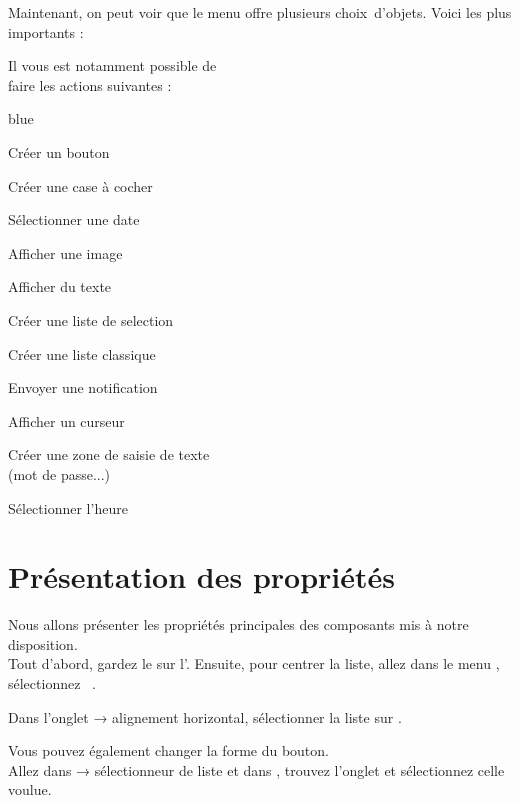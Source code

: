 Maintenant, on peut voir que le menu offre plusieurs choix d'objets. Voici les plus importants :

Il vous est notamment possible de \\faire les actions suivantes :

\begin{items}{blue}{\Triangle}
    \item Créer un bouton
    \item Créer une case à cocher
    \item Sélectionner une date
    \item Afficher une image
    \item Afficher du texte
    \item Créer une liste de selection
    \item Créer une liste classique
    \item Envoyer une notification
    \item Afficher un curseur
    \item Créer une zone de saisie de texte \\(mot de passe...)
    \item Sélectionner l'heure
\end{items}



\section{Présentation des propriétés}

Nous allons présenter les propriétés principales des composants mis à notre disposition. \\
\noindent
Tout d'abord, gardez le  sur l'.
Ensuite, pour centrer la liste, allez dans le menu , sélectionnez  .

Dans l'onglet  → alignement horizontal, sélectionner la liste sur . 


Vous pouvez également changer la forme du bouton. \\
Allez dans  → sélectionneur de liste et dans , trouvez l'onglet  
et sélectionnez celle voulue.    

